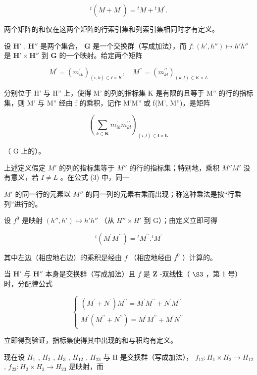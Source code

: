 \[
{ } ^ { t } ( M + M ^ { \prime } ) = { } ^ { t } M + { } ^ { t } M ^ { \prime } .\tag{2}
\]

两个矩阵的和仅在这两个矩阵的行索引集和列索引集相同时才有定义。

设 \(\mathbf{H}'\) , \(\mathbf{H}''\) 是两个集合， \(\mathbf{G}\) 是一个交换群（写成加法），而 \(f: (h', h'') \mapsto h'h''\) 是 \(\mathbf{H}' \times \mathbf{H}''\) 到 \(\mathbf{G}\) 的一个映射。给定两个矩阵

\[
M ^ {\prime} = \left(m _ {i k} ^ {\prime}\right) _ {(i, k) \in I \times K}, \quad M ^ {\prime \prime} = \left(m _ {k l} ^ {\prime \prime}\right) _ {(k, l) \in K \times L}
\]

分别位于 H' 与 H'' 上，使得 M' 的列的指标集 K 是有限的且等于 M'' 的行的指标集，则 M' 与 M'' 经由 f 的乘积，记作 M'M'' 或 f(M', M'')，是矩阵

\[
\left(\sum_ {k \in \mathbf {K}} m _ {i k} ^ {\prime} m _ {k l} ^ {\prime \prime}\right) _ {(i, l) \in \mathbf {I} \times \mathbf {L}}\tag{3}
\]

（ G 上的）。

上述定义假定 \(M'\) 的列的指标集等于 \(M''\) 的行的指标集；特别地，乘积 \(M''M'\) 没有意义，若 \(I \neq L\) 。在公式 (3) 中，同一

 \(M'\) 的同一行的元素以 \(M''\) 的同一列的元素右乘而出现；称这种乘法是按“行乘列”进行的。

设 \(f^0\) 是映射 \((h'', h') \mapsto h'h''\) （从 \(H'' \times H'\) 到 G）；由定义立即可得

\[
{ } ^ { t } ( M ^ { \prime } M ^ { \prime \prime } ) = { } ^ { t } M ^ { \prime \prime } . { } ^ { t } M ^ { \prime }\tag{4}
\]

其中左边（相应地右边）的乘积是经由 \(f\) （相应地经由 \(f^0\) ）计算的。

当 \(\mathbf{H}'\) 与 \(\mathbf{H}''\) 本身是交换群（写成加法）且 \(f\) 是 \(\mathbf{Z}\) -双线性（ \(\S 3\) ，第 1 号）时，分配律公式

\[
\left\{ \begin{array}{l} (M ^ {\prime} + N ^ {\prime}) M ^ {\prime \prime} = M ^ {\prime} M ^ {\prime \prime} + N ^ {\prime} M ^ {\prime \prime} \\ M ^ {\prime} (M ^ {\prime \prime} + N ^ {\prime \prime}) = M ^ {\prime} M ^ {\prime \prime} + M ^ {\prime} N ^ {\prime \prime} \end{array} \right.\tag{5}
\]

立即得到验证，指标集使得其中出现的和与积均有定义。

现在设 \(H_{1}\) , \(H_{2}\) , \(H_{3}\) , \(H_{12}\) , \(H_{23}\) 与 H 是交换群（写成加法）， \(f_{12}:H_{1} \times H_{2} \to H_{12}\) , \(f_{23}:H_{2} \times H_{3} \to H_{23}\) 是映射，而

